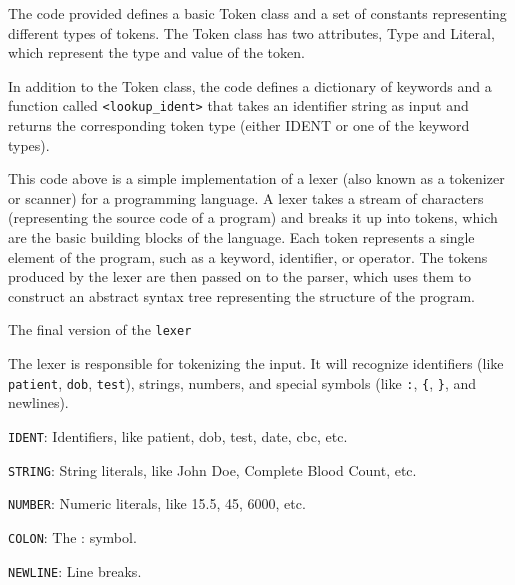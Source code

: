 The code provided defines a basic Token class and a set of constants representing different types of tokens. The Token class has two attributes, Type and Literal, which represent the type and value of the token.

In addition to the Token class, the code defines a dictionary of keywords and a function called \texttt{<lookup\_ident>} that takes an identifier string as input and returns the corresponding token type (either IDENT or one of the keyword types).

This code above is a simple implementation of a lexer (also known as a tokenizer or scanner) for a programming language. A lexer takes a stream of characters (representing the source code of a program) and breaks it up into tokens, which are the basic building blocks of the language. Each token represents a single element of the program, such as a keyword, identifier, or operator. The tokens produced by the lexer are then passed on to the parser, which uses them to construct an abstract syntax tree representing the structure of the program.

The final version of the \texttt{lexer}

The lexer is responsible for tokenizing the input. It will recognize identifiers (like \texttt{patient}, \texttt{dob}, \texttt{test}), strings, numbers, and special symbols (like \texttt{:}, \texttt{\{}, \texttt{\}}, and newlines).

\texttt{IDENT}: Identifiers, like patient, dob, test, date, cbc, etc.

\texttt{STRING}: String literals, like John Doe, Complete Blood Count, etc.

\texttt{NUMBER}: Numeric literals, like 15.5, 45, 6000, etc.

\texttt{COLON}: The : symbol.

\texttt{NEWLINE}: Line breaks.



